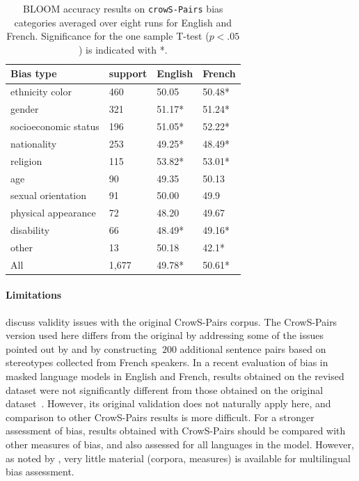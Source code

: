 \documentclass[twoside,11pt]{article}
\begin{document}
 \begin{table}
 \centering
 \begin{tabular}{lll|l}
 \toprule
 Bias type              & support &English & French \\
 \midrule
 ethnicity \/ color     & 460   & 50.05     & 50.48* \\
 gender                 & 321   & 51.17*    & 51.24* \\
 socioeconomic status   &196    & 51.05*    & 52.22*\\
 nationality            &253    & 49.25*    & 48.49* \\
 religion               &115    & 53.82*     & 53.01*\\
 age                    &90     & 49.35     & 50.13 \\
 sexual orientation     &91     & 50.00     & 49.9 \\
 physical appearance    &72     & 48.20     & 49.67\\
 disability             &66     & 48.49*    & 49.16* \\
 other                  & 13    & 50.18     & 42.1* \\
 \midrule
 All & 1,677 & 49.78* & 50.61* \\
 \bottomrule
 \end{tabular}
 \caption{BLOOM accuracy results on \texttt{crowS-Pairs} bias categories averaged over eight runs for English and French. Significance for the one sample T-test ($p<.05$) is indicated with *.}
 \label{tab:crowspairs_disaggregated}
 \end{table}

\paragraph{Limitations}
\cite{blodgett-etal-2021-stereotyping} discuss validity issues with the original CrowS-Pairs corpus. The CrowS-Pairs version used here differs from the original by addressing some of the issues pointed out by \citet{blodgett-etal-2021-stereotyping} and by constructing $~200$ additional sentence pairs based on stereotypes collected from French speakers.
In a recent evaluation of bias in masked language models in English and French, results obtained on the revised dataset were not significantly different from those obtained on the original dataset~\cite{neveol-etal-2022-french}. However, its original validation does not naturally apply here, and comparison to other CrowS-Pairs results is more difficult. 
For a stronger assessment of bias, results obtained with CrowS-Pairs should be compared with other measures of bias, and also assessed for all languages in the model. However, as noted by \cite{talat2022you}, very little material (corpora, measures) is available for multilingual bias assessment. 
\end{document}
